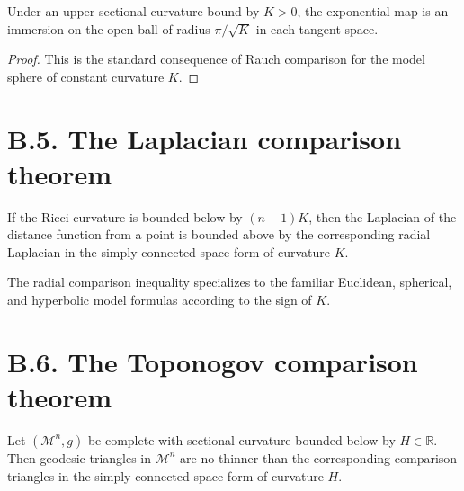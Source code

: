 \begin{corollary}
\label{appb-cor-rauch-injectivity-radius}
Under an upper sectional curvature bound by $K>0$, the exponential map is an immersion on the open ball of radius $\pi/\sqrt K$ in each tangent space.
\end{corollary}

\begin{proof}
This is the standard consequence of Rauch comparison for the model sphere of constant curvature $K$.
\end{proof}

\section*{B.5. The Laplacian comparison theorem}

\begin{theorem}
\label{appb-thm-laplacian-comparison}
If the Ricci curvature is bounded below by $(n-1)K$, then the Laplacian of the distance function from a point is bounded above by the corresponding radial Laplacian in the simply connected space form of curvature $K$.
\end{theorem}

\begin{corollary}
\label{appb-cor-model-space-radial-comparison}
The radial comparison inequality specializes to the familiar Euclidean, spherical, and hyperbolic model formulas according to the sign of $K$.
\end{corollary}

\section*{B.6. The Toponogov comparison theorem}

\begin{theorem}
\label{appb-thm-toponogov-comparison}
Let $(\mathcal M^n,g)$ be complete with sectional curvature bounded below by $H\in\mathbb R$. Then geodesic triangles in $\mathcal M^n$ are no thinner than the corresponding comparison triangles in the simply connected space form of curvature $H$.
\end{theorem}


